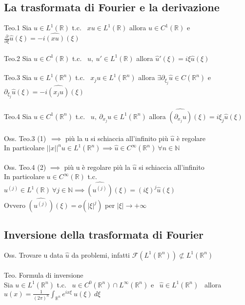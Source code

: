 \documentclass{article}
\theoremstyle{unnumbered}
\theoremstyle{unnumbered1}
\renewcommand{\hat}{\widehat}
\begin{document}
\subsection{La trasformata di Fourier e la derivazione}
%
Teo.1 Sia $u\in L^1(\mathbb{R})$ t.c. \ $xu\in L^1(\mathbb{R})$ allora $\hat{u}\in C^1(\mathbb{R})$ e $\frac{\partial}{\partial\xi}\hat{u}(\xi)=-i\widehat{(xu)}(\xi)$\\ \\
%
Teo.2 Sia $u\in C^1(\mathbb{R})$ t.c. \ $u, \ u' \in L^1(\mathbb{R})$ allora $\hat{u}'(\xi)=i\xi\hat{u}(\xi)$\\ \\
%
Teo.3 Sia $u\in L^1(\mathbb{R}^n)$ t.c. \ $x_ju\in L^1(\mathbb{R}^n)$ allora $\exists \partial_{\xi_j}\hat{u}\in C(\mathbb{R}^n)$ e $\partial_{\xi_j}\hat{u}(\xi)=-i\widehat{(x_ju)}(\xi)$\\ \\
%
Teo.4 Sia $u\in C^1(\mathbb{R}^n)$ t.c. \ $u, \ \partial_{x_j}u \in L^1(\mathbb{R}^n)$ allora $\widehat{(\partial_{x_j}u)}(\xi)=i\xi_j\hat{u}(\xi)$\\ \\
%
%
Oss. Teo.3 (1)\ $\implies$ più la u si schiaccia all'infinito più $\hat{u}$ è regolare \\ In particolare $||x||^nu\in L^1(\mathbb{R}^n) \implies \hat{u}\in C^{\infty}(\mathbb{R}^n) \ \forall n\in\mathbb{N}$\\ \\
%
Oss. Teo.4 (2) $\implies$ più u è regolare più la $\hat{u}$ si schiaccia all'infinito \\ In particolare $u\in C^{\infty}(\mathbb{R})$ t.c. $u^{(j)}\in L^1(\mathbb{R}) \ \forall j\in\mathbb{N} \implies \widehat{(u^{(j)})}(\xi)=(i\xi)^j\hat{u}(\xi)$\\
Ovvero $\widehat{(u^{(j)})}(\xi)=o(|\xi|^j)$ per $|\xi|\to +\infty$\\




\subsection{Inversione della trasformata di Fourier}
%
Oss. Trovare u data $\hat{u}$ da problemi, infatti $\mathcal{F}(L^1(\mathbb{R}^n))\not\subset L^1(\mathbb{R}^n)$\\ \\
%
%
Teo. Formula di inversione \\
Sia $u\in L^1(\mathbb{R}^n)$ t.c. \ $u\in C^0(\mathbb{R}^n)\cap L^{\infty}(\mathbb{R}^n)$ e \ $\hat{u}\in L^1(\mathbb{R}^n)$ \ allora \ $u(x)=\frac{1}{(2\pi)^n}\int_{\mathbb{R}^n}e^{ix\xi}\ \hat{u}(\xi)\ d\xi$
\end{document}
